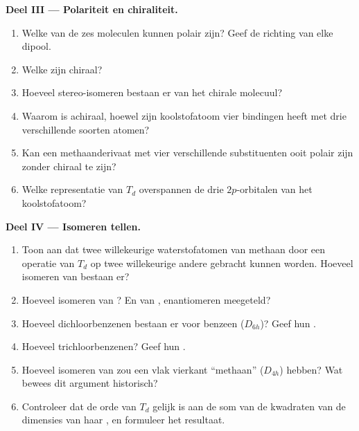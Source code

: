 \begin{problem}
\medskip\noindent\textbf{Deel III --- Polariteit en chiraliteit.}
\begin{enumerate}[resume]
  \item Welke van de zes moleculen kunnen polair zijn? Geef de richting van
        elke dipool.
  \item Welke zijn chiraal?
  \item Hoeveel stereo-isomeren bestaan er van het chirale molecuul?
  \item Waarom is  achiraal, hoewel zijn koolstofatoom vier
        bindingen heeft met drie verschillende soorten atomen?
  \item Kan een methaanderivaat met vier verschillende substituenten ooit
        polair zijn zonder chiraal te zijn?
  \item Welke representatie van $T_d$ overspannen de drie $2p$-orbitalen van
        het koolstofatoom?
\end{enumerate}

\medskip\noindent\textbf{Deel IV --- Isomeren tellen.}
\begin{enumerate}[resume]
  \item Toon aan dat twee willekeurige waterstofatomen van methaan door een
        operatie van $T_d$ op twee willekeurige andere gebracht kunnen
        worden. Hoeveel isomeren van  bestaan er?
  \item Hoeveel isomeren van ? En van , enantiomeren
        meegeteld?
  \item Hoeveel dichloorbenzenen bestaan er voor benzeen ($D_{6h}$)? Geef hun
        .
  \item Hoeveel trichloorbenzenen? Geef hun .
  \item Hoeveel isomeren van  zou een vlak vierkant ``methaan''
        ($D_{4h}$) hebben? Wat bewees dit argument historisch?
  \item Controleer dat de orde van $T_d$ gelijk is aan de som van de
        kwadraten van de dimensies van haar , en
        formuleer het resultaat.
\end{enumerate}
\end{problem}
